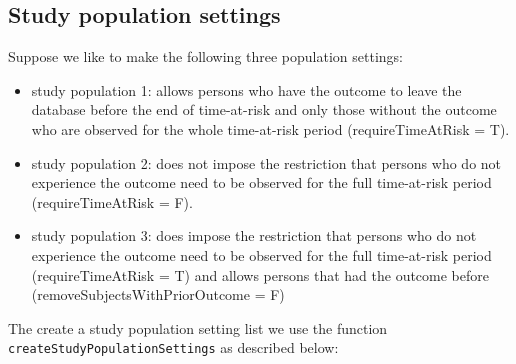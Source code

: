 \documentclass[
]{article}
\providecommand{\tightlist}{%
  \setlength{\itemsep}{0pt}\setlength{\parskip}{0pt}}
\begin{document}
\hypertarget{study-population-settings}{%
\subsection{Study population settings}\label{study-population-settings}}

Suppose we like to make the following three population settings:

\begin{itemize}
\tightlist
\item
  study population 1: allows persons who have the outcome to leave the
  database before the end of time-at-risk and only those without the
  outcome who are observed for the whole time-at-risk period
  (requireTimeAtRisk = T).
\item
  study population 2: does not impose the restriction that persons who
  do not experience the outcome need to be observed for the full
  time-at-risk period (requireTimeAtRisk = F).
\item
  study population 3: does impose the restriction that persons who do
  not experience the outcome need to be observed for the full
  time-at-risk period (requireTimeAtRisk = T) and allows persons that
  had the outcome before (removeSubjectsWithPriorOutcome = F)
\end{itemize}

The create a study population setting list we use the function
\texttt{createStudyPopulationSettings} as described below:
\end{document}
